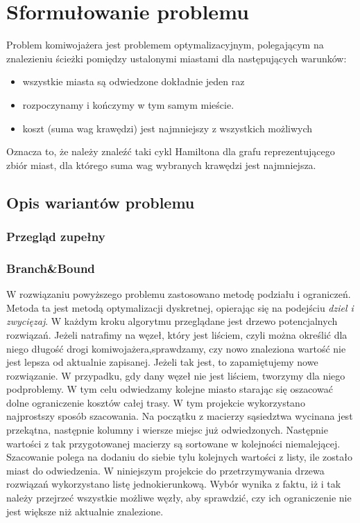 \documentclass{article}
\begin{document}
\section{Sformułowanie problemu}
		Problem komiwojażera jest problemem optymalizacyjnym, polegającym na znalezieniu ścieżki pomiędzy ustalonymi miastami dla następujących warunków: 
		\begin{itemize}
			\item wszystkie miasta są odwiedzone dokładnie jeden raz
			\item rozpoczynamy i kończymy w tym samym mieście.
			\item koszt (suma wag krawędzi) jest najmniejszy z wszystkich możliwych
		\end{itemize}
		Oznacza to, że należy znaleźć taki cykl Hamiltona dla grafu reprezentującego zbiór miast, dla którego suma wag wybranych krawędzi jest najmniejsza.
		
	\subsection{Opis wariantów problemu}	
		\subsubsection{Przegląd zupełny}
		\subsubsection{Branch\&Bound}
			
				W rozwiązaniu powyższego problemu zastosowano metodę podziału i ograniczeń. Metoda ta jest metodą optymalizacji dyskretnej, opierając się na podejściu \textit{dziel i zwycięzaj}.
				W każdym kroku algorytmu przeglądane jest drzewo potencjalnych rozwiązań. Jeżeli natrafimy na węzeł, który jest liściem, czyli można określić dla niego długość drogi komiwojażera,sprawdzamy, czy nowo znaleziona wartość nie jest lepsza od aktualnie zapisanej. Jeżeli tak jest, to zapamiętujemy nowe rozwiązanie. W przypadku, gdy dany węzeł nie jest liściem, tworzymy dla niego podproblemy. W tym celu odwiedzamy kolejne miasto starając się oszacować dolne ograniczenie kosztów całej trasy. W tym projekcie wykorzystano najprostszy sposób szacowania. Na początku z macierzy sąsiedztwa wycinana jest przekątna, następnie kolumny i wiersze miejsc już odwiedzonych. Następnie wartości z tak przygotowanej macierzy są sortowane w kolejności niemalejącej. Szacowanie polega na dodaniu do siebie tylu kolejnych wartości z listy, ile zostało miast do odwiedzenia. W niniejszym projekcie do przetrzymywania drzewa rozwiązań wykorzystano listę jednokierunkową. Wybór wynika z faktu, iż i tak należy przejrzeć wszystkie możliwe węzły, aby sprawdzić, czy ich ograniczenie nie jest większe niż aktualnie znalezione.
				
\end{document}
